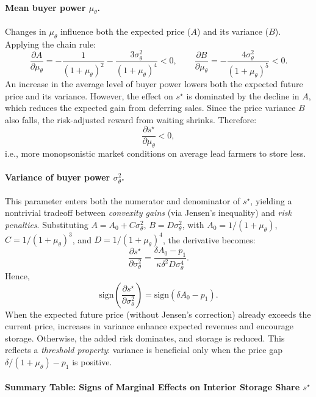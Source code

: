 \paragraph{Mean buyer power \(\mu_\theta\).}
Changes in \(\mu_\theta\) influence both the expected price (\(A\)) and its variance (\(B\)). Applying the chain rule:
$$
\frac{\partial A}{\partial \mu_\theta} = -\frac{1}{(1 + \mu_\theta)^2} - \frac{3\sigma_\theta^2}{(1 + \mu_\theta)^4} < 0,\qquad
\frac{\partial B}{\partial \mu_\theta} = -\frac{4\sigma_\theta^2}{(1 + \mu_\theta)^5} < 0.
$$
An increase in the average level of buyer power lowers both the expected future price and its variance. However, the effect on \(s^{\star}\) is dominated by the decline in \(A\), which reduces the expected gain from deferring sales. Since the price variance \(B\) also falls, the risk-adjusted reward from waiting shrinks. Therefore:
$$
\frac{\partial s^{\star}}{\partial \mu_\theta} < 0,
$$
i.e., more monopsonistic market conditions on average lead farmers to store less.

\paragraph{Variance of buyer power \(\sigma_\theta^2\).}
This parameter enters both the numerator and denominator of \(s^{\star}\), yielding a nontrivial tradeoff between \textit{convexity gains} (via Jensen's inequality) and \textit{risk penalties}. Substituting \(A = A_0 + C\sigma_\theta^2\), \(B = D\sigma_\theta^2\), with \(A_0 = 1/(1 + \mu_\theta)\), \(C = 1/(1 + \mu_\theta)^3\), and \(D = 1/(1 + \mu_\theta)^4\), the derivative becomes:
$$
\frac{\partial s^{\star}}{\partial \sigma_\theta^2}
=
\frac{\delta A_0 - p_1}{\kappa \delta^2 D \sigma_\theta^4}.
$$
Hence,
$$
\text{sign}\left( \frac{\partial s^{\star}}{\partial \sigma_\theta^2} \right)
= \text{sign}\left( \delta A_0 - p_1 \right).
$$
When the expected future price (without Jensen's correction) already exceeds the current price, increases in variance enhance expected revenues and encourage storage. Otherwise, the added risk dominates, and storage is reduced. This reflects a \textit{threshold property}: variance is beneficial only when the price gap \(\delta/(1 + \mu_\theta) - p_1\) is positive.

\paragraph{Summary Table: Signs of Marginal Effects on Interior Storage Share \(s^{\star}\)}

